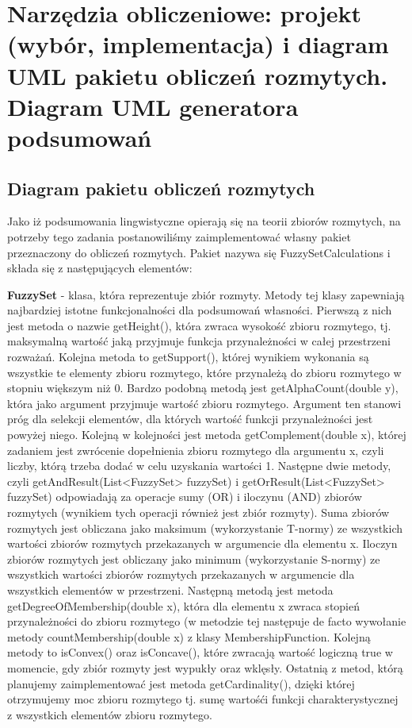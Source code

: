 \documentclass{classrep}
\begin{document}
\section{Narzędzia obliczeniowe: projekt (wybór, implementacja) i diagram UML pakietu obliczeń rozmytych. Diagram UML generatora podsumowań}
\subsection{Diagram pakietu obliczeń rozmytych}
Jako iż podsumowania lingwistyczne opierają się na teorii zbiorów rozmytych, na potrzeby tego zadania postanowiliśmy zaimplementować własny pakiet przeznaczony do obliczeń rozmytych. Pakiet nazywa się FuzzySetCalculations i składa się z następujących elementów:

{\bf FuzzySet} - klasa, która reprezentuje zbiór rozmyty. 
Metody tej klasy zapewniają najbardziej istotne funkcjonalności dla podsumowań własności. 
Pierwszą z nich jest metoda o nazwie getHeight(), która zwraca wysokość zbioru rozmytego, tj. maksymalną wartość jaką przyjmuje funkcja przynależności w całej przestrzeni rozważań.
Kolejna metoda to getSupport(), której wynikiem wykonania są wszystkie te elementy zbioru rozmytego, które przynależą do zbioru rozmytego w stopniu większym niż 0. Bardzo podobną metodą jest getAlphaCount(double y), która jako argument przyjmuje wartość zbioru rozmytego. Argument ten stanowi próg dla selekcji elementów, dla których wartość funkcji przynależności jest powyżej niego. Kolejną w kolejności jest metoda getComplement(double x), której zadaniem jest zwrócenie dopełnienia zbioru rozmytego dla argumentu x, czyli liczby, którą trzeba dodać w celu uzyskania wartości 1. Następne dwie metody, czyli getAndResult(List<FuzzySet> fuzzySet) i getOrResult(List<FuzzySet> fuzzySet) odpowiadają za operacje sumy (OR) i iloczynu (AND) zbiorów rozmytych (wynikiem tych operacji również jest zbiór rozmyty). Suma zbiorów rozmytych jest obliczana jako maksimum (wykorzystanie T-normy) ze wszystkich wartości zbiorów rozmytych przekazanych w argumencie dla elementu x. Iloczyn zbiorów rozmytych jest obliczany jako minimum (wykorzystanie S-normy) ze wszystkich wartości zbiorów rozmytych przekazanych w argumencie dla wszystkich elementów w przestrzeni. Następną metodą jest metoda getDegreeOfMembership(double x), która dla elementu x zwraca stopień przynależności do zbioru rozmytego (w metodzie tej następuje de facto wywołanie metody countMembership(double x) z klasy MembershipFunction.
Kolejną metody to isConvex() oraz isConcave(), które zwracają wartość logiczną true w momencie, gdy zbiór rozmyty jest wypukły oraz wklęsły. Ostatnią z metod, którą planujemy zaimplementować jest metoda getCardinality(), dzięki której otrzymujemy moc zbioru rozmytego tj. sumę wartośći funkcji charakterystycznej z wszystkich elementów zbioru rozmytego. \cite{niewiadomski08}\\
\end{document}

